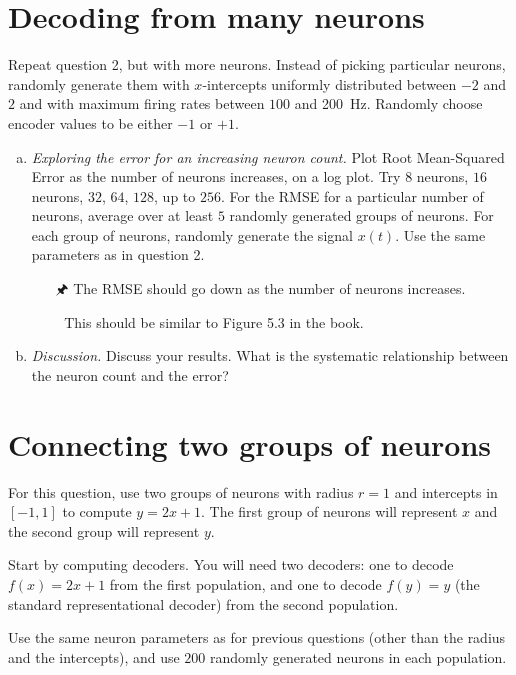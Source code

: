 	\newpage
	
	\section{Decoding from many neurons}
	
	Repeat question 2, but with more neurons. Instead of picking particular neurons, randomly generate them with $x$-intercepts uniformly distributed between $-2$ and $2$ and with maximum firing rates between $100$ and \SI{200}{\hertz}. Randomly choose encoder values to be either $-1$ or $+1$.

	\begin{enumerate}[a)]
		\item {} \emph{Exploring the error for an increasing neuron count.} Plot Root Mean-Squared Error as the number of neurons increases, on a log plot. Try $8$ neurons, $16$ neurons, $32$, $64$, $128$, up to $256$. For the RMSE for a particular number of neurons, average over at least $5$ randomly generated groups of neurons. For each group of neurons, randomly generate the signal $x(t)$. Use the same parameters as in question 2.
		\begin{itemize}
			\item[\symbolfont 🖈] The RMSE should go down as the number of neurons increases.
			\item[\symbolfont  📖] This should be similar to Figure 5.3 in the book.
		\end{itemize}
		\item {} \emph{Discussion.} Discuss your results. What is the systematic relationship between the neuron count and the error?
	\end{enumerate}

	\section{Connecting two groups of neurons}
		
	For this question, use two groups of neurons with radius $r = 1$ and intercepts in $[-1, 1]$ to compute $y = 2x+1$. The first group of neurons will represent $x$ and the second group will represent $y$.
	
	Start by computing decoders. You will need two decoders: one to decode $f(x)=2x+1$ from the first population, and one to decode $f(y)=y$ (the standard representational decoder) from the second population.
	
	Use the same neuron parameters as for previous questions (other than the radius and the intercepts), and use $200$ randomly generated neurons in each population.

